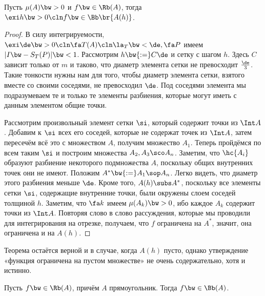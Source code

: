 \documentclass[a4paper]{article}
\begin{document}
\begin{theorem}
Пусть $\mu(A) \bw> 0$ и $f \bw\in \Rb(A)$, тогда $\exi h \bw> 0\cln f \bw\in \Bb\br{A(h)}$.
\end{theorem}
\begin{proof}
В силу интегрируемости, $\exi \de\bw>0\cln \fa T(A)\cln \la_T \bw< \de, \fa P$ имеем $|I \bw- S_T(P)| \bw< 1$.
Рассмотрим $h \bw{:=}C\de$ и сетку с шагом $h$. Здесь $C$ зависит только от $m$ и таково, что
диаметр элемента сетки не превосходит $\frac{\de}{3}$. Такие тонкости нужны нам для того, чтобы
диаметр элемента сетки, взятого вместе со своими соседями, не превосходил $\de$. Под соседями
элемента мы подразумеваем те и только те элементы разбиения, которые могут иметь с данным элементом
общие точки.

Рассмотрим произвольный элемент сетки $\si$, который содержит точки из $\Int A$. Добавим к $\si$
всех его соседей, которые не содержат точек из $\Int A$, затем пересечём всё это с множеством $A$,
получим множество $A_1$. Теперь пройдёмся по всем таким $\si$ и построим множества $A_2,A_3\sco
A_n$. Заметим, что $\hc{A_i}$ образуют разбиение некоторого подмножества $A$, поскольку общих
внутренних точек они не имеют. Положим $A^* \bw{:=}A_1\sop A_n$. Легко видеть, что диаметр этого
разбиения меньше $\de$. Кроме того, $A(h) \subs A^*$, поскольку все элементы сетки $\si$,
содержащие внутренние точки, были окружены слоем соседей толщиной $h$. Заметим, что $\fa k$ имеем
$\mu(A_k) \bw> 0$, ибо каждое $A_k$ содержит точки из $\Int A$. Повторяя слово в слово рассуждения,
которые мы проводили для интегрирования на отрезке, получаем, что $f$ ограничена на $A^*$, значит,
она ограничена и на $A(h)$.
\end{proof}

\begin{note}
Теорема остаётся верной и в случае, когда $A(h)$ пусто, однако утверждение «функция ограничена на
пустом множестве» не очень содержательно, хотя и истинно.
\end{note}

\begin{imp}
Пусть $f \bw\in \Rb(A)$, причём $A$ прямоугольник. Тогда $f \bw\in \Bb(A)$.
\end{imp}
\end{document}
